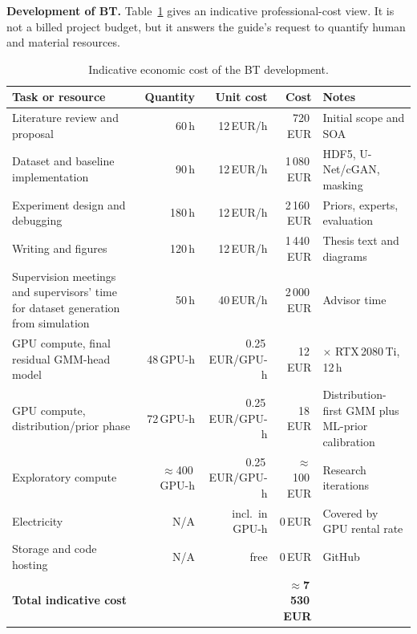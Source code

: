 \textbf{Development of BT.} Table~\ref{tab:sustainability_budget} gives an
indicative professional-cost view. It is not a billed project budget, but it
answers the guide's request to quantify human and material resources.

\begin{table}[htbp]
\centering
\footnotesize
\renewcommand{\arraystretch}{1.1}
\caption{Indicative economic cost of the BT development.}
\label{tab:sustainability_budget}
\begin{tabularx}{\textwidth}{>{\raggedright\arraybackslash}Xrrr>{\raggedright\arraybackslash}p{3cm}}
\toprule
Task or resource & Quantity & Unit cost & Cost & Notes \\
\midrule
Literature review and proposal     & 60\,h         & 12\,EUR/h        &    720\,EUR & Initial scope and SOA \\
Dataset and baseline implementation & 90\,h        & 12\,EUR/h        & 1\,080\,EUR & HDF5, U-Net/cGAN, masking \\
Experiment design and debugging    & 180\,h        & 12\,EUR/h        & 2\,160\,EUR & Priors, experts, evaluation \\
Writing and figures                & 120\,h        & 12\,EUR/h        & 1\,440\,EUR & Thesis text and diagrams \\
Supervision meetings and supervisors' time for dataset generation from simulation & 50\,h         & 40\,EUR/h        & 2\,000\,EUR & Advisor time \\
GPU compute, final residual GMM-head model    & 48\,GPU-h     & 0.25\,EUR/GPU-h  &    12\,EUR  & 4$\times$ RTX\,2080\,Ti, 12\,h \\
GPU compute, distribution/prior phase & 72\,GPU-h  & 0.25\,EUR/GPU-h  &    18\,EUR  & Distribution-first GMM plus ML-prior calibration \\
Exploratory compute                & $\approx$400\,GPU-h & 0.25\,EUR/GPU-h & $\approx$100\,EUR & Research iterations \\
Electricity                        & N/A           & incl.\ in GPU-h  &     0\,EUR  & Covered by GPU rental rate \\
Storage and code hosting           & N/A           & free             &     0\,EUR  & GitHub \\
\midrule
\textbf{Total indicative cost}     &               &                  & \textbf{$\approx$7\,530\,EUR} & \\
\bottomrule
\end{tabularx}
\end{table}

